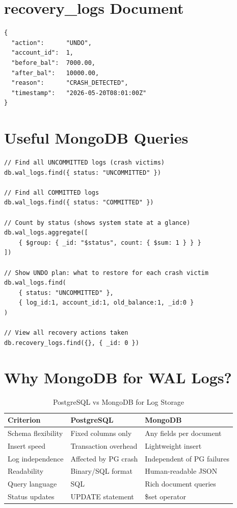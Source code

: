 \section{recovery\_logs Document}

\begin{lstlisting}[style=jsonstyle, caption={Recovery Log --- written by RecoveryManager after UNDO}]
{
  "action":      "UNDO",
  "account_id":  1,
  "before_bal":  7000.00,
  "after_bal":   10000.00,
  "reason":      "CRASH_DETECTED",
  "timestamp":   "2026-05-20T08:01:00Z"
}
\end{lstlisting}

\section{Useful MongoDB Queries}

\begin{lstlisting}[style=jsonstyle, caption={Key mongosh queries for demo and viva}]
// Find all UNCOMMITTED logs (crash victims)
db.wal_logs.find({ status: "UNCOMMITTED" })

// Find all COMMITTED logs
db.wal_logs.find({ status: "COMMITTED" })

// Count by status (shows system state at a glance)
db.wal_logs.aggregate([
    { $group: { _id: "$status", count: { $sum: 1 } } }
])

// Show UNDO plan: what to restore for each crash victim
db.wal_logs.find(
    { status: "UNCOMMITTED" },
    { log_id:1, account_id:1, old_balance:1, _id:0 }
)

// View all recovery actions taken
db.recovery_logs.find({}, { _id: 0 })
\end{lstlisting}

\section{Why MongoDB for WAL Logs?}

\begin{table}[H]
\centering
\caption{PostgreSQL vs MongoDB for Log Storage}
\begin{tabularx}{\textwidth}{lXX}
\toprule
\textbf{Criterion} & \textbf{PostgreSQL} & \textbf{MongoDB} \\
\midrule
Schema flexibility & Fixed columns only & Any fields per document \\
Insert speed & Transaction overhead & Lightweight insert \\
Log independence & Affected by PG crash & Independent of PG failures \\
Readability & Binary/SQL format & Human-readable JSON \\
Query language & SQL & Rich document queries \\
Status updates & UPDATE statement & \$set operator \\
\bottomrule
\end{tabularx}
\end{table}
